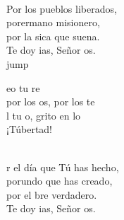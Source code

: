\begin{cancion}
	\jump\\
Por los pueblos liberados, \\
	porermano misionero, \\
	por la sica que suena.\\
	Te doy ias, Señor os.\\jump\\
	\begin{chorus}%
	eo tu re\\
	por los os, por los te  \\
	l tu o, grito en lo \\
	¡Túbertad! \\
	\end{chorus}%
	\jump\\
	r el día que Tú has hecho, \\
	porundo que has creado, \\
	por el bre verdadero.\\
	Te doy ias, Señor os.\\
\end{cancion}%
